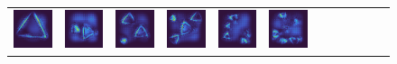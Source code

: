 \documentclass[letterpaper]{article} %
\begin{document}
\begin{figure}[!htbp]
\begin{tabular}{cccccccccccc}
\multicolumn{1}{c}{\includegraphics[width=0.125\columnwidth]{saliency/ce/circle/triangle_1.png}} \hspace{-12pt} &  \multicolumn{1}{c}{\includegraphics[width=0.125\columnwidth]{saliency/ce/circle/triangle_2.png}} \hspace{-12pt} & \multicolumn{1}{c}{\includegraphics[width=0.125\columnwidth]{saliency/ce/circle/triangle_3.png}} \hspace{-12pt} & \multicolumn{1}{c}{\includegraphics[width=0.125\columnwidth]{saliency/ce/circle/triangle_4.png}} \hspace{-12pt} & \multicolumn{1}{c}{\includegraphics[width=0.125\columnwidth]{saliency/ce/circle/triangle_5.png}} \hspace{-12pt} & \multicolumn{1}{c}{\includegraphics[width=0.125\columnwidth]{saliency/ce/circle/triangle_6.png}} \hspace{-12pt} &

\end{tabular}
\end{figure}
\end{document}
